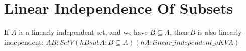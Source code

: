 \section{Linear Independence Of Subsets}

\begin{theorem}
  \label{theorem : subset_linear_independent}
  \leanok
  If $A$ is a linearly independent set, and we have $B \subseteq A$, then $B$ is also linearly independent: ${A B : Set V} (hBsubA : B \subseteq A) (hA : linear\_independent\_v K V A)$
\end{theorem}
